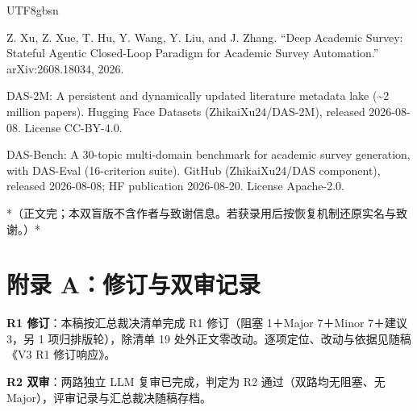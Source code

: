 \documentclass[10pt,a4paper]{article}
\begin{document}
\begin{CJK}{UTF8}{gbsn}
\begin{list}{}
\item [{[42]}] Z. Xu, Z. Xue, T. Hu, Y. Wang, Y. Liu, and J. Zhang. ``Deep Academic Survey: Stateful Agentic Closed-Loop Paradigm for Academic Survey Automation.'' arXiv:2608.18034, 2026.
\item [{[43]}] DAS-2M: A persistent and dynamically updated literature metadata lake (\textasciitilde{}2 million papers). Hugging Face Datasets (ZhikaiXu24/DAS-2M), released 2026-08-08. License CC-BY-4.0.
\item [{[44]}] DAS-Bench: A 30-topic multi-domain benchmark for academic survey generation, with DAS-Eval (16-criterion suite). GitHub (ZhikaiXu24/DAS component), released 2026-08-08; HF publication 2026-08-20. License Apache-2.0.
\end{list}

*（正文完；本双盲版不含作者与致谢信息。若获录用后按恢复机制还原实名与致谢。）*


\section*{附录 A：修订与双审记录}\textbf{R1 修订}：本稿按汇总裁决清单完成 R1 修订（阻塞 1＋Major 7＋Minor 7＋建议 3，另 1 项归排版轮），除清单 19 处外正文零改动。逐项定位、改动与依据见随稿《V3 R1 修订响应》。

\textbf{R2 双审}：两路独立 LLM 复审已完成，判定为 R2 通过（双路均无阻塞、无 Major），评审记录与汇总裁决随稿存档。


\end{CJK}
\end{document}
